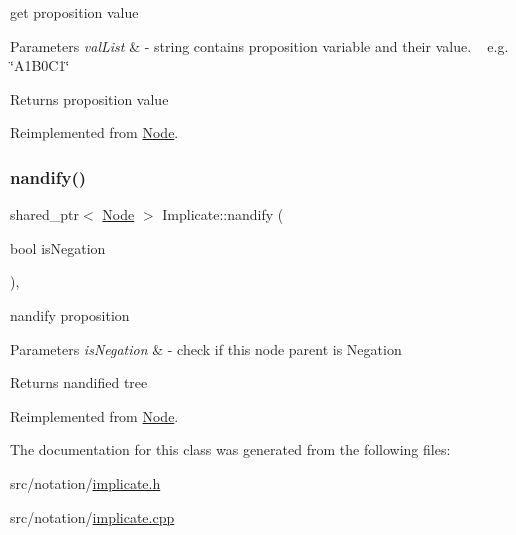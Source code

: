 get proposition value 


\begin{DoxyParams}{Parameters}
{\em val\+List} & -\/ string contains proposition variable and their value. ~\newline
 e.\+g. \char`\"{}\+A1\+B0\+C1\char`\"{} \\
\hline
\end{DoxyParams}
\begin{DoxyReturn}{Returns}
proposition value 
\end{DoxyReturn}


Reimplemented from \hyperlink{class_node_afd0c2045f3955e02e3aa1e2e987f10b2}{Node}.

\mbox{\label{class_implicate_a9f3b5d35f552a62ca4a98b4f608a2968}} 
\subsubsection{\texorpdfstring{nandify()}{nandify()}}
{\footnotesize\ttfamily shared\+\_\+ptr$<$ \hyperlink{class_node}{Node} $>$ Implicate\+::nandify (\begin{DoxyParamCaption}\item[{bool}]{is\+Negation }\end{DoxyParamCaption})\hspace{0.3cm}{\ttfamily [override]}, {\ttfamily [virtual]}}



nandify proposition 


\begin{DoxyParams}{Parameters}
{\em is\+Negation} & -\/ check if this node parent is Negation \\
\hline
\end{DoxyParams}
\begin{DoxyReturn}{Returns}
nandified tree 
\end{DoxyReturn}


Reimplemented from \hyperlink{class_node_a3b2e192b59b7e72908af7903c5a4e5c1}{Node}.



The documentation for this class was generated from the following files\+:\begin{DoxyCompactItemize}
\item 
src/notation/\hyperlink{implicate_8h}{implicate.\+h}\item 
src/notation/\hyperlink{implicate_8cpp}{implicate.\+cpp}\end{DoxyCompactItemize}
